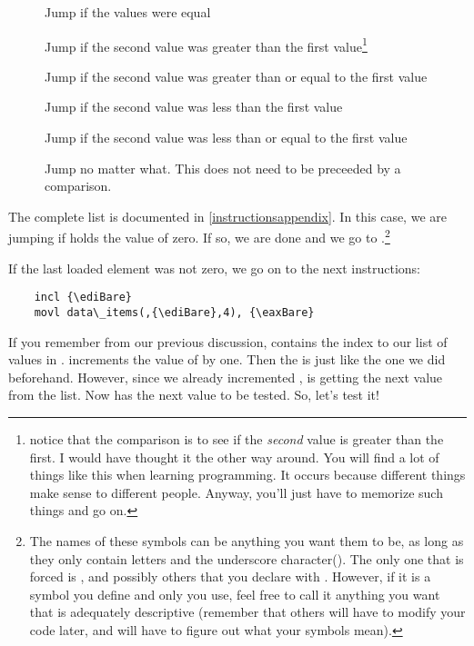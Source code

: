 \begin{description}
\item[] Jump if the values were equal
\item[] Jump if the second value was greater than the first 
value\footnote{notice that the comparison is to see if the
\emph{second} value is greater than the first.  I
would have thought it the other way around.  You will find a lot of
things like this when learning programming.  It occurs because different
things make sense to different people.  Anyway, you'll just have to
memorize such things and go on.}
\item[] Jump if the second value was greater than or equal to the first value
\item[] Jump if the second value was less than the first value
\item[] Jump if the second value was less than or equal to the first value
\item[] Jump no matter what.  This does not need to be preceeded by a 
comparison.
\end{description}

The complete list is documented in \autoref{instructionsappendix}.
In this case, we are jumping if {\eaxReg} holds the value
of zero.  If so, we are done and we go to 
.\footnote{The names of these symbols
can be anything you want them to be, as long as they only contain letters
and the underscore character(\icode{\_}).  The only one that
is forced is , and possibly others that you
declare with .  However, if it is a symbol you
define and only you use, feel free to call it anything you want that is 
adequately descriptive (remember that others will have to modify your code 
later, and will have to figure out what your symbols mean).
}

If the last loaded element was not zero, we go on to the next instructions:

\begin{simpletyping}
\begin{lstlisting}
	incl {\ediBare}
	movl data\_items(,{\ediBare},4), {\eaxBare}
\end{lstlisting}
\end{simpletyping}

If you remember from our previous discussion, {\ediReg} contains
the index to 
our list of values in .
increments the value of {\ediReg} by
one.  Then the  is just like the one we did 
beforehand.  However, since we already incremented {\ediReg}, {\eaxReg} is getting the
next value from the list.  Now {\eaxReg} has the next value to be tested.  
So, let's test it!

